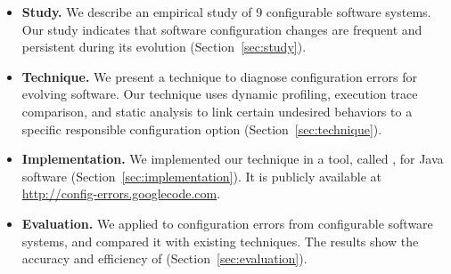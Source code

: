 \begin{itemize}
\vspace{-3mm}
\item \textbf{Study.} We describe an empirical
study of 9 configurable software systems.
Our study indicates that software configuration changes
are frequent and persistent during its evolution (Section~\ref{sec:study}).

\item \textbf{Technique.} We present a technique to diagnose
configuration errors for evolving software. Our technique
uses dynamic profiling, execution trace comparison, and
static analysis to link certain undesired behaviors to a
specific responsible configuration option (Section~\ref{sec:technique}).

\item \textbf{Implementation.} We implemented our technique
in a tool, called \ourtool, for Java software (Section~\ref{sec:implementation}).
It is publicly available at \url{http://config-errors.googlecode.com}.

\item \textbf{Evaluation.} We applied \ourtool to \errornum configuration
errors from \subjnum configurable software systems,
and compared it with existing techniques.
The results show the accuracy and efficiency of \ourtool (Section~\ref{sec:evaluation}).
\end{itemize}
